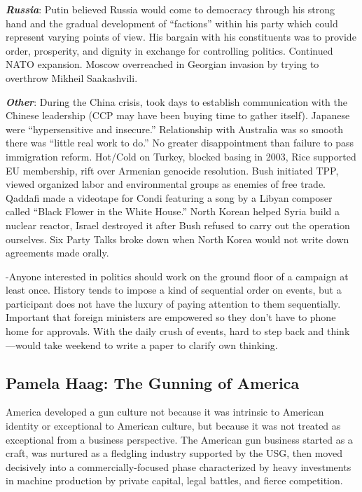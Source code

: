 \documentclass[
]{article}
\begin{document}
\textbf{\emph{Russia}}: Putin believed Russia would come to democracy
through his strong hand and the gradual development of ``factions''
within his party which could represent varying points of view. His
bargain with his constituents was to provide order, prosperity, and
dignity in exchange for controlling politics. Continued NATO expansion.
Moscow overreached in Georgian invasion by trying to overthrow Mikheil
Saakashvili.

\textbf{\emph{Other}}: During the China crisis, took days to establish
communication with the Chinese leadership (CCP may have been buying time
to gather itself). Japanese were ``hypersensitive and insecure.''
Relationship with Australia was so smooth there was ``little real work
to do.'' No greater disappointment than failure to pass immigration
reform. Hot/Cold on Turkey, blocked basing in 2003, Rice supported EU
membership, rift over Armenian genocide resolution. Bush initiated TPP,
viewed organized labor and environmental groups as enemies of free
trade. Qaddafi made a videotape for Condi featuring a song by a Libyan
composer called ``Black Flower in the White House.'' North Korean helped
Syria build a nuclear reactor, Israel destroyed it after Bush refused to
carry out the operation ourselves. Six Party Talks broke down when North
Korea would not write down agreements made orally.

-Anyone interested in politics should work on the ground floor of a
campaign at least once. History tends to impose a kind of sequential
order on events, but a participant does not have the luxury of paying
attention to them sequentially. Important that foreign ministers are
empowered so they don't have to phone home for approvals. With the daily
crush of events, hard to step back and think---would take weekend to
write a paper to clarify own thinking.

\hypertarget{pamela-haag-the-gunning-of-america}{%
\subsection{Pamela Haag: The Gunning of
America}\label{pamela-haag-the-gunning-of-america}}

America developed a gun culture not because it was intrinsic to American
identity or exceptional to American culture, but because it was not
treated as exceptional from a business perspective. The American gun
business started as a craft, was nurtured as a fledgling industry
supported by the USG, then moved decisively into a commercially-focused
phase characterized by heavy investments in machine production by
private capital, legal battles, and fierce competition.
\end{document}
